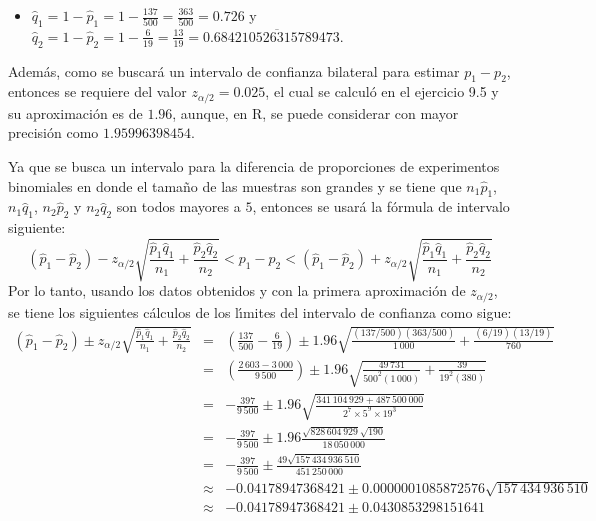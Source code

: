 \begin{solucion}
\begin{itemize}
  \item $\hat{q}_1 = 1 - \hat{p}_1 = 1 - \frac{137}{500} = \frac{363}{500} = 0.726$ y $\hat{q}_2 = 1 - \hat{p}_2 = 1 - \frac{6}{19} = \frac{13}{19} = 0.\overline{684210526315789473}$.
 \end{itemize}
 Adem\'as, como se buscar\'a un intervalo de confianza bilateral para estimar $p_1 - p_2$, entonces se requiere del valor $z_{\alpha/2} = 0.025$, el cual se calcul\'o en el ejercicio 9.5 y su aproximaci\'on es de $1.96$, aunque, en R, se puede considerar con mayor precisi\'on como $1.95996398454$.
 \par 
 Ya que se busca un intervalo para la diferencia de proporciones de experimentos binomiales en donde el tama\~no de las muestras son grandes y se tiene que $n_1\hat{p}_1$, $n_1\hat{q}_1$, $n_2\hat{p}_2$ y $n_2\hat{q}_2$ son todos mayores a $5$, entonces se usar\'a la f\'ormula de intervalo siguiente:
 \begin{equation*}
  \left( \hat{p}_1 - \hat{p}_2 \right) - z_{\alpha/2}\sqrt{\frac{\hat{p}_1\hat{q}_1}{n_1} + \frac{\hat{p}_2\hat{q}_2}{n_2}} < p_1 - p_2 < \left( \hat{p}_1 - \hat{p}_2 \right) + z_{\alpha/2}\sqrt{\frac{\hat{p}_1\hat{q}_1}{n_1} + \frac{\hat{p}_2\hat{q}_2}{n_2}}
 \end{equation*}
 Por lo tanto, usando los datos obtenidos y con la primera aproximaci\'on de $z_{\alpha/2}$, se tiene los siguientes c\'alculos de los l\'{\i}mites del intervalo de confianza como sigue:
 \begin{eqnarray*}
  \left( \hat{p}_1 - \hat{p}_2 \right) \pm z_{\alpha/2}\sqrt{\frac{\hat{p}_1\hat{q}_1}{n_1} + \frac{\hat{p}_2\hat{q}_2}{n_2}} & = & \left( \frac{137}{500} - \frac{6}{19} \right) \pm 1.96\sqrt{\frac{(137/500)(363/500)}{1\,000} + \frac{(6/19)(13/19)}{760}} \\
  & = & \left( \frac{2\,603 - 3\,000}{9\,500} \right) \pm 1.96\sqrt{\frac{49\,731}{500^2(1\,000)} + \frac{39}{19^2(380)}} \\
  & = & - \frac{397}{9\,500} \pm 1.96\sqrt{\frac{341\,104\,929 + 487\,500\,000}{2^7\times 5^9 \times 19^3}} \\
  & = & - \frac{397}{9\,500} \pm 1.96 \frac{\sqrt{828\,604\,929}\sqrt{190}}{18\,050\,000} \\
  & = & - \frac{397}{9\,500} \pm \frac{49\sqrt{157\,434\,936\,510}}{451\,250\,000}  \\
  & \approx & -0.04178947368421 \pm 0.0000001085872576\sqrt{157\,434\,936\,510} \\
  & \approx & -0.04178947368421 \pm 0.0430853298151641

\end{eqnarray*}
\end{solucion}
